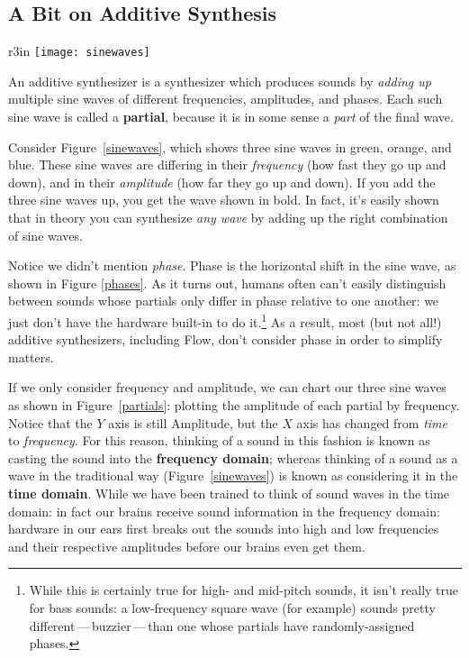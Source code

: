 \documentclass{article}
\newcommand\name{Flow}
\begin{document}
\subsection{A Bit on Additive Synthesis}  
\label{additivesynthesis}

\begin{wrapfigure}{r}{3in}
\vspace{-1em}
\texttt{[image: sinewaves]}
\caption{Three sine waves (colored) and the result of adding them up (in bold).}
\label{sinewaves}
\vspace{-1em}
\end{wrapfigure}

An additive synthesizer is a synthesizer which produces sounds by {\it adding up} multiple sine waves of different frequencies, amplitudes, and phases.  Each such sine wave is called a {\bf partial}, because it is in some sense a {\it part} of the final wave.

Consider Figure~\ref{sinewaves}, which shows three sine waves in green, orange, and blue.  These sine waves are differing in their {\it frequency} (how fast they go up and down), and in their {\it amplitude} (how far they go up and down).  If you add the three sine waves up, you get the wave shown in bold.  In fact, it's easily shown that in theory you can synthesize {\it any wave} by adding up the right combination of sine waves.

Notice we didn't mention {\it phase}.  Phase is the horizontal shift in the sine wave, as shown in Figure \ref{phases}.  As it turns out, humans often can't easily distinguish between sounds whose partials only differ in phase relative to one another: we just don't have the hardware built-in to do it.\footnote{While this is certainly true for high- and mid-pitch sounds, it isn't really true for bass sounds: a low-frequency square wave (for example) sounds pretty different\,---\,buzzier\,---\,than one whose partials have randomly-assigned phases.}   As a result, most (but not all!) additive synthesizers, including {\name}, don't consider phase in order to simplify matters.

If we only consider frequency and amplitude, we can chart our three sine waves as shown in Figure~\ref{partials}: plotting the amplitude of each partial by frequency.  Notice that the \(Y\) axis is still Amplitude, but the \(X\) axis has changed from {\it time} to {\it frequency}. For this reason, thinking of a sound in this fashion is known as casting the sound into the {\bf frequency domain}; whereas thinking of a sound as a wave in the traditional way (Figure~\ref{sinewaves}) is known as considering it in the {\bf time domain}.  While we have been trained to think of sound waves in the time domain: in fact our brains receive sound information in the frequency domain: hardware in our ears first breaks out the sounds into high and low frequencies and their respective amplitudes before our brains even get them.
\end{document}
